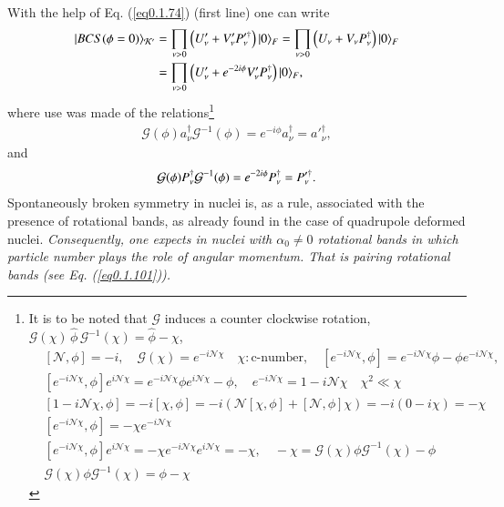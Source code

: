 With the help of Eq. (\ref{eq0.1.74}) (first line) one can write
\begin{align}\label{eq0.1.84}
\nonumber |{BCS(\phi=0)} \rangle_{\mathcal K'}&=\prod_{\nu>0}\left(U'_\nu+V'_\nu P_\nu'^\dagger\right)|{0} \rangle_F=\prod_{\nu>0}\left(U_\nu+V_\nu P^\dagger_\nu\right)|{0} \rangle_F\\
&=\prod_{\nu>0}\left(U'_\nu+e^{-2i\phi}V'_\nu P^\dagger_\nu\right)|{0} \rangle_F,
\end{align}
where use was made of the relations\footnote{It is to be noted that $\mathcal G$ induces a counter clockwise rotation, $\mathcal G(\chi)\,\hat\phi\, \mathcal G^{-1}(\chi)=\hat\phi-\chi$,
	\begin{align*}
	&[\mathcal N,\phi]=-i,\quad\mathcal G(\chi)=e^{-i\mathcal N\chi}\quad \chi:\text{c-number},\quad[e^{-i\mathcal N\chi},\phi]=e^{-i\mathcal N\chi}\phi-\phi e^{-i\mathcal N\chi},\\
	&[e^{-i\mathcal N\chi},\phi]e^{i\mathcal N\chi}=e^{-i\mathcal N\chi}\phi e^{i\mathcal N\chi}-\phi,\quad e^{-i\mathcal N\chi}=1-i\mathcal N\chi\quad \chi^2\ll\chi\\
	&[1-i\mathcal N\chi,\phi]=-i[\mathcal\chi,\phi]=-i\left(\mathcal N[\chi,\phi]+[\mathcal N,\phi]\chi\right)=-i(0-i\chi)=-\chi\\
	&[e^{-i\mathcal N\chi},\phi]=-\chi e^{-i\mathcal N\chi}\\
	&[e^{-i\mathcal N\chi},\phi]e^{i\mathcal N\chi}=-\chi e^{-i\mathcal N\chi}e^{i\mathcal N\chi}=-\chi,\quad -\chi=\mathcal G(\chi)\phi\mathcal G^{-1}(\chi)-\phi\\
	&\mathcal G(\chi)\phi\mathcal G^{-1}(\chi)=\phi-\chi
	\end{align*}
}
\begin{align}\label{eq0.1.85}
\mathcal G(\phi)a^\dagger_\nu \mathcal G^{-1}(\phi)=e^{-i\phi}a^\dagger_\nu=a'^\dagger_\nu,
\end{align}
and 
\begin{align}\label{eq0.1.86}
\mathcal G(\phi)P^\dagger_\nu \mathcal G^{-1}(\phi)=e^{-2i\phi}P^\dagger_\nu=P'^\dagger_\nu. \idx{Gauge!--transformation}
\end{align}
Spontaneously broken symmetry in nuclei is, as a rule, associated with the presence of rotational bands, as already found in the case of quadrupole deformed nuclei. \textit{Consequently, one expects in nuclei with $\alpha_0\neq0$ rotational bands in which particle number plays the role of angular momentum. That is pairing rotational bands (see Eq. (\ref{eq0.1.101})).}



